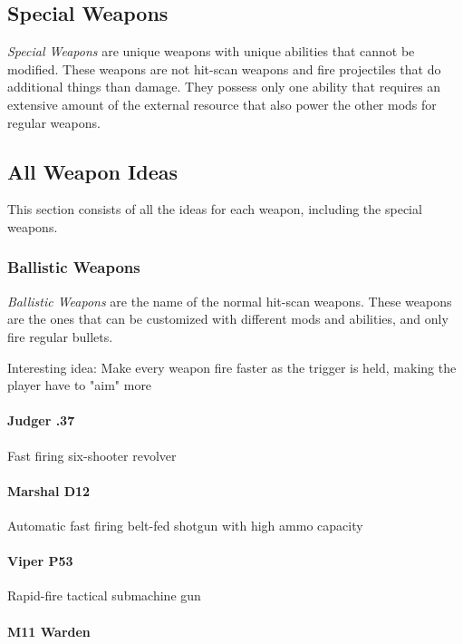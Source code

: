 \documentclass[../Main.tex]{subfiles}
\begin{document}
\subsection{Special Weapons}

\emph{Special Weapons} are unique weapons with unique abilities that cannot be modified. These weapons are not hit-scan weapons and fire projectiles that do additional things than damage. They possess only one ability that requires an extensive amount of the external resource that also power the other mods for regular weapons. 

\subsection{All Weapon Ideas}

This section consists of all the ideas for each weapon, including the special weapons.

\subsubsection{Ballistic Weapons}

\emph{Ballistic Weapons} are the name of the normal hit-scan weapons. These weapons are the ones that can be customized with different mods and abilities, and only fire regular bullets.

Interesting idea: Make every weapon fire faster as the trigger is held, making the player have to "aim" more 

\paragraph{Judger .37}

Fast firing six-shooter revolver

\paragraph{Marshal D12}

Automatic fast firing belt-fed shotgun with high ammo capacity

\paragraph{Viper P53}

Rapid-fire tactical submachine gun

\paragraph{M11 Warden}
\end{document}
